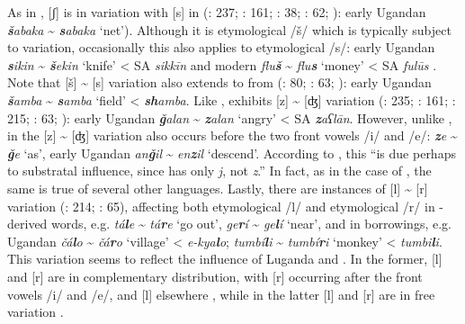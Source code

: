 \documentclass[output=paper]{langsci/langscibook}
\begin{document}
  As in  , [ʃ] is in variation with [s] in  (\citealt{Owens1985}: 237; \citealt{Owens1997}: 161; \citealt{Wellens2003}: 38; \citealt{Luffin2005}: 62; \citealt{Avram2017talk}): early Ugandan  \textit{\textbf{š}abaka} {\textasciitilde} \textit{\textbf{s}abaka} ‘net’). Although it is etymological /š/ which is typically subject to variation, occasionally this also applies to etymological /s/: early Ugandan  \textit{\textbf{s}ikin} {\textasciitilde} \textit{\textbf{š}ekin} ‘knife’ < SA \textit{sikkīn} \citep{Avram2017talk} and modern  \textit{flu\textbf{š}} {\textasciitilde} \textit{flu\textbf{s}} ‘money’ < SA \textit{fulūs} \citep[63]{Luffin2005}. Note that [š] {\textasciitilde} [s] variation also extends to  from  (\citealt{Wellens2003}: 80; \citealt{Luffin2005}: 63; \citealt{Avram2017talk}): early Ugandan  \textit{\textbf{š}amba} {\textasciitilde} \textit{\textbf{s}amba} ‘field’ <  \textit{\textbf{sh}amba}. Like  ,  exhibits [z] {\textasciitilde} [ʤ] variation (\citealt{Owens1985}: 235; \citealt{Owens1997}: 161; \citealt{Wellens2003}: 215; \citealt{Luffin2005}: 63; \citealt{Avram2017talk}): early Ugandan  \textit{\textbf{ǧ}alan} {\textasciitilde} \textit{\textbf{z}alan} ‘angry’ < SA \textit{\textbf{z}aʕlān}. However, unlike  , in  the [z] {\textasciitilde} [ʤ] variation also occurs before the two front vowels /i/ and /e/: \textit{\textbf{z}e} {\textasciitilde} \textit{\textbf{ǧ}e} ‘as’, early Ugandan  \textit{an\textbf{ǧ}il} {\textasciitilde} \textit{en\textbf{z}il} ‘descend’. According to \citet[161]{Owens1997}, this “is due perhaps to  substratal influence, since  has only \textit{j}, not \textit{z}.” In fact, as in the case of  , the same is true of several other  languages. Lastly, there are instances of [l] {\textasciitilde} [r] variation (\citealt{Wellens2003}: 214; \citealt{Luffin2005}: 65), affecting both etymological /l/ and etymological /r/ in -derived words, e.g. \textit{tá\textbf{l}e} {\textasciitilde} \textit{tá\textbf{r}e} ‘go out’, \textit{ge\textbf{r}í} {\textasciitilde} \textit{ge\textbf{l}í} ‘near’, and in borrowings, e.g. Ugandan  \textit{čá\textbf{l}o} {\textasciitilde} \textit{čá\textbf{r}o} ‘village’ <  \textit{e-kya\textbf{l}o};  \textit{tumbí\textbf{l}i} {\textasciitilde} \textit{tumbí\textbf{r}i} ‘monkey’ <  \textit{tumbi\textbf{l}i}. This variation seems to reflect the influence of \mbox{Luganda} and . In the former, [l] and [r] are in complementary distribution, with [r] occurring after the front vowels /i/ and /e/, and [l] elsewhere \citep[214]{Wellens2003}, while in the latter [l] and [r] are in free variation \citep[79]{Luffin2014}. 
\end{document}
